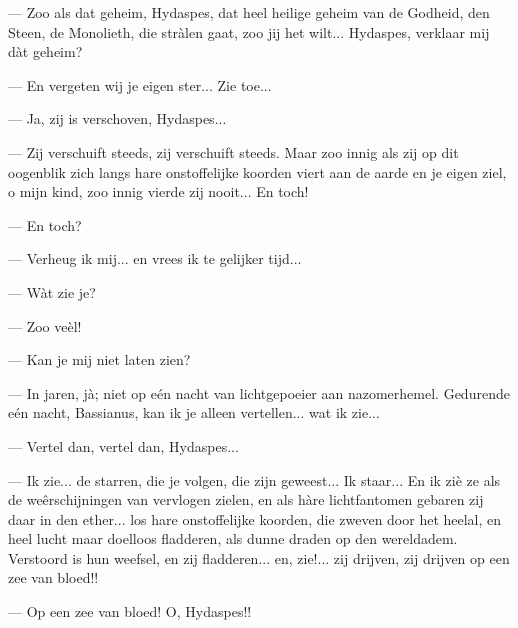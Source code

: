 \documentclass[a4paper, 12pt, oneside, dutch]{article}
\begin{document}
--- Zoo als dat geheim, Hydaspes, dat heel heilige geheim van de Godheid, den Steen, de Monolieth, die stràlen gaat, zoo jij het wilt... Hydaspes, verklaar mij dàt geheim?

--- En vergeten wij je eigen ster... Zie toe...

--- Ja, zij is verschoven, Hydaspes...

--- Zij verschuift steeds, zij verschuift steeds. Maar zoo innig als zij op dit oogenblik zich langs hare onstoffelijke koorden viert aan de aarde en je eigen ziel, o mijn kind, zoo innig vierde zij nooit... En toch!

--- En toch?

--- Verheug ik mij... en vrees ik te gelijker tijd...

--- Wàt zie je?

--- Zoo veèl!

--- Kan je mij niet laten zien?

--- In jaren, jà; niet op eén nacht van lichtgepoeier aan nazomerhemel. Gedurende eén nacht, Bassianus, kan ik je alleen vertellen... wat ik zie...

--- Vertel dan, vertel dan, Hydaspes...

--- Ik zie... de starren, die je volgen, die zijn geweest... Ik staar... En ik ziè ze als de weêrschijningen van vervlogen zielen, en als hàre lichtfantomen gebaren zij daar in den ether... los hare onstoffelijke koorden, die zweven door het heelal, en heel lucht maar doelloos fladderen, als dunne draden op den wereldadem. Verstoord is hun weefsel, en zij fladderen... en, zie!... zij drijven, zij drijven op een zee van bloed!!

--- Op een zee van bloed! O, Hydaspes!!
\end{document}
